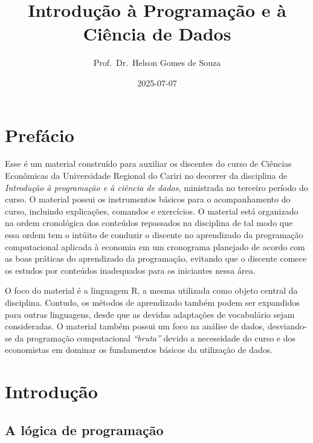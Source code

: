 \documentclass[
  letterpaper,
  DIV=11,
  numbers=noendperiod]{scrreprt}
\title{Introdução à Programação e à Ciência de Dados}
\author{Prof.~Dr.~Helson Gomes de Souza}
\date{2025-07-07}
\renewcommand*\contentsname{Table of contents}
\newcommand\contentsname{Table of contents}
\begin{document}
\maketitle

\renewcommand*\contentsname{Table of contents}
{
\hypersetup{linkcolor=}
\setcounter{tocdepth}{2}
\tableofcontents
}


\chapter*{Prefácio}\label{prefuxe1cio}


Esse é um material construído para auxiliar os discentes do curso de
Ciências Econômicas da Universidade Regional do Cariri no decorrer da
disciplina de \emph{Introdução à programação e à ciência de dados,}
ministrada no terceiro período do curso. O material possui os
instrumentos básicos para o acompanhamento do curso, incluindo
explicações, comandos e exercícios. O material está organizado na ordem
cronológica dos conteúdos repassados na disciplina de tal modo que essa
ordem tem o intúito de conduzir o discente no aprendizado da programação
computacional aplicada à economia em um cronograma planejado de acordo
com as boas práticas do aprendizado da programação, evitando que o
discente comece os estudos por conteúdos inadequados para os iniciantes
nessa área.

O foco do material é a linguagem R, a mesma utilizada como objeto
central da disciplina. Contudo, os métodos de aprendizado também podem
ser expandidos para outras linguagens, desde que as devidas adaptações
de vocabulário sejam consideradas. O material também possui um foco na
análise de dados, desviando-se da programação computacional
\emph{``bruta''} devido a necessidade do curso e dos economistas em
dominar os fundamentos básicos da utilização de dados.


\chapter{Introdução}\label{introduuxe7uxe3o}

\section{A lógica de
programação}\label{a-luxf3gica-de-programauxe7uxe3o}
\end{document}
